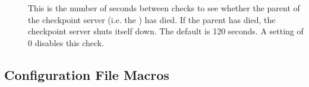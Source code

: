 \begin{description}
\item[]
  \label{param:CkptServerCheckParentInterval}  This is the number of
  seconds between checks to see whether the parent of the checkpoint
  server (i.e. the ) has died.  If the parent has died,
  the checkpoint server shuts itself down.  The default is 120 seconds.
  A setting of 0 disables this check.

\end{description}


\subsection{\label{sec:Master-Config-File-Entries} Configuration File Macros} 

